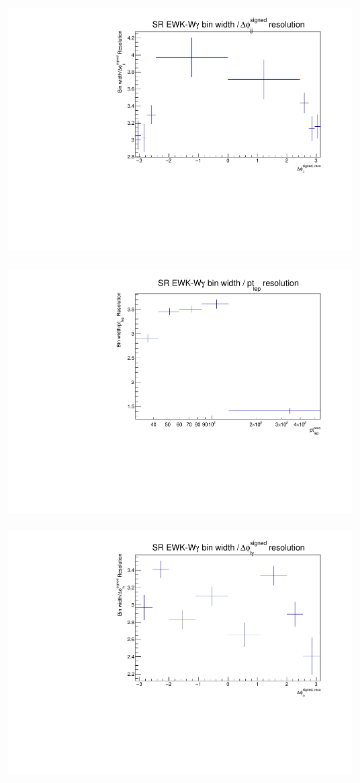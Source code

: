 \begin{figure}[t]
\begin{subfigure}[b]{0.48\textwidth}
    \includegraphics[width=\textwidth]{plots/diffx/binning/jj_dphi_signed_resolutions_rebin_SR.pdf}
    \caption{}
\end{subfigure}
\hfill
\begin{subfigure}[b]{0.48\textwidth}
    \centering
    \includegraphics[width=\textwidth]{plots/diffx/binning/lep_pt_resolutions_rebin_SR.pdf}
    \caption{}
\end{subfigure}
\begin{subfigure}[b]{0.48\textwidth}
    \centering
    \includegraphics[width=\textwidth]{plots/diffx/binning/lepgam_dphi_signed_resolutions_rebin_SR.pdf}

\end{subfigure}
\end{figure}
